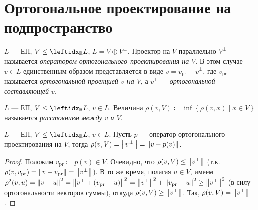 \section{Ортогональное проектирование на подпространство}

\begin{defn}
    $L$ --- ЕП, $V \le \lsub{\mathbb{R}}{L}$, $L = V \oplus V^\perp$. Проектор на $V$ параллельно $V^\perp$ называется \textit{оператором ортогонального проектирования на $V$}. В этом случае $v \in L$ единственным образом представляется в виде $v = v_{\text{pr}} + v^\perp$, где $v_{\text{pr}}$ называется \textit{ортогональной проекцией $v$ на $V$}, а $v^\perp$ --- \textit{ортогональной составляющей $v$}.
\end{defn}

\begin{defn}
    $L$ --- ЕП, $V \le \lsub{\mathbb{R}}{L}$, $v \in L$. Величина $\rho(v, V) \coloneqq \inf \left\{ \rho(v, x) \mid x \in V \right\}$ называется \textit{расстоянием между $v$ и $V$}.
\end{defn}

\begin{thm*}
    $L$ --- ЕП, $V \le \lsub{\mathbb{R}}{L}$, $v \in L$. Пусть $p$ --- оператор ортогонального проектирования на $V$, тогда $\rho(v, V) = \left\lVert v^\perp\right\rVert = \left\lVert v - p(v)\right\rVert$.
\end{thm*}

\begin{proof}
    Положим $v_{\text{pr}} \coloneqq p(v) \in V$. Очевидно, что $\rho(v, V) \le \left\lVert v^\perp\right\rVert$ (т.к. $\rho(v, v_\text{pr}) = \left\lVert v - v_\text{pr}\right\rVert = \left\lVert v^\perp\right\rVert$). В то же время, полагая $u \in V$, имеем $\rho^2(v, u) = \left\lVert v - u\right\rVert^2 = \left\lVert v^\perp + (v_\text{pr} - u)\right\rVert^2 = \left\lVert v^\perp\right\rVert^2 + \left\lVert v_\text{pr} - u\right\rVert^2 \ge \left\lVert v^\perp\right\rVert^2$ (в силу ортогональности векторов суммы), откуда $\rho(v, V) \ge \left\lVert v^\perp\right\rVert$. Так, $\rho(v, V) = \left\lVert v^\perp\right\rVert$.
\end{proof}